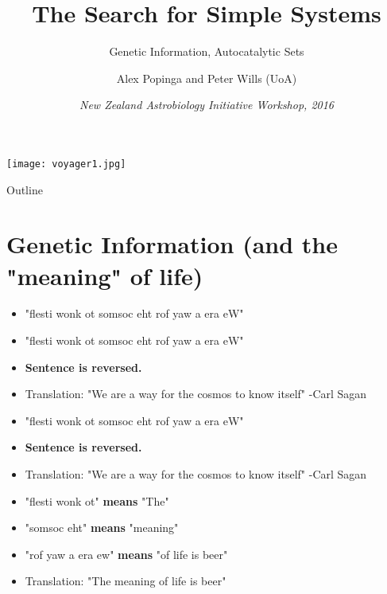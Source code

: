 \documentclass{beamer}
\title{\bf{The Search for Simple Systems}}
\subtitle{Genetic Information, Autocatalytic Sets}
\author{Alex Popinga and Peter Wills (UoA)} %

{

}
\date{\small{\textit{New Zealand Astrobiology Initiative Workshop, 2016}}}
\begin{document}
\usebackgroundtemplate%
{%
    \texttt{[image: voyager1.jpg]}%
}

\begin{frame}
  \titlepage
\end{frame}

\begin{frame}{Outline}
  \tableofcontents
\end{frame}

\section{Genetic Information (and the "meaning" of life)}

\begin{frame}
\begin{itemize}
\item "flesti wonk ot somsoc eht rof yaw a era eW" 
\end{itemize}
\end{frame}

\begin{frame}
\begin{itemize}
\item "flesti wonk ot somsoc eht rof yaw a era eW" 
\end{itemize}

\begin{itemize}
\item \textbf{Sentence is reversed.}
\item Translation:  "We are a way for the cosmos to know itself" -Carl Sagan
\end{itemize}
\end{frame}

\begin{frame}
\begin{itemize}
\item "flesti wonk ot somsoc eht rof yaw a era eW" 
\end{itemize}

\begin{itemize}
\item \textbf{Sentence is reversed.}
\item Translation:  "We are a way for the cosmos to know itself" -Carl Sagan
\end{itemize}

\begin{itemize}
\item "flesti wonk ot" \textbf{means} "The"
\item "somsoc eht" \textbf{means} "meaning"
\item "rof yaw a era ew" \textbf{means} "of life is beer"
\item Translation:  "The meaning of life is beer" 
\end{itemize}
\end{frame}
\end{document}
